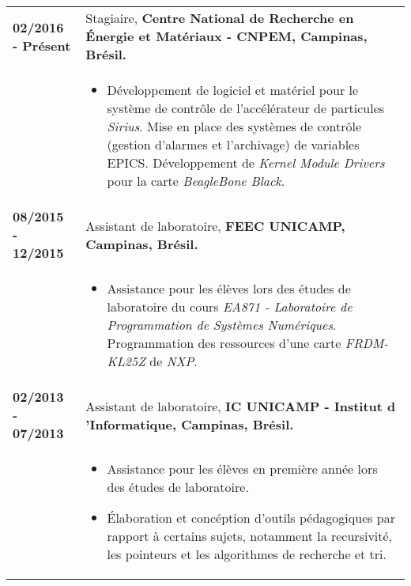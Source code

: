 \documentclass[10pt, a4paper]{article}
\begin{document}
\begin{tabular}{p{} p{}}

\textbf{02/2016 - Présent}  & Stagiaire, \textbf{Centre National de
Recherche en Énergie et Matériaux - CNPEM, Campinas, Brésil.}
 \\
  & \vspace{-8pt}
  \begin{itemize}
    \item Développement de logiciel et matériel pour le système
    de contrôle de l'accélérateur de particules \textit{Sirius}.
    Mise en place des systèmes de contrôle (gestion d'alarmes et l'archivage) de
    variables EPICS. Développement de \textit{Kernel Module Drivers} pour la
    carte \textit{BeagleBone Black}.
    
	\end{itemize}\\

\textbf{08/2015 - 12/2015}  & Assistant de laboratoire, \textbf{FEEC
 UNICAMP, Campinas, Brésil.}
 \\
  & \vspace{-8pt}
  \begin{itemize}
    \item Assistance pour les élèves lors des études de
    laboratoire du cours \textit{EA871 - Laboratoire de Programmation de
    Systèmes Numériques}. Programmation des ressources 
    d'une carte \textit{FRDM-KL25Z} de \textit{NXP}.
    
	\end{itemize}\\


 \textbf{02/2013 - 07/2013}   & Assistant de laboratoire, \textbf{IC UNICAMP -
 Institut d 'Informatique, Campinas, Brésil.} \\
  & \vspace{-8pt}
  \begin{itemize}
    \item Assistance pour les élèves en première année lors des études de
    laboratoire.
    \item Élaboration et concéption d'outils pédagogiques par rapport
    à certains sujets, notamment la recursivité, les pointeurs et les
    algorithmes de recherche et  tri.
	\end{itemize}\\


\end{tabular}
\end{document}
